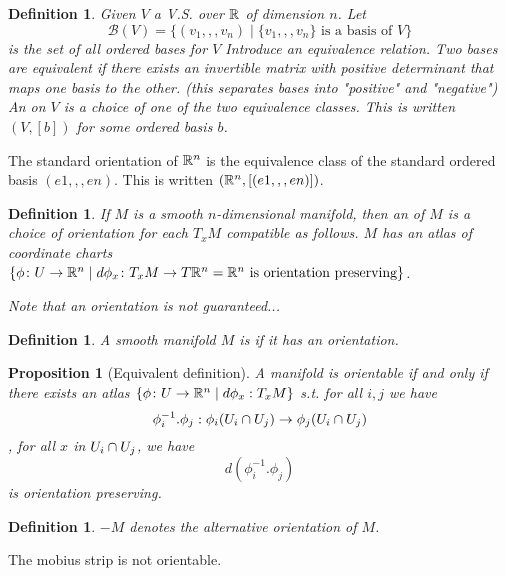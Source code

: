 \documentclass[11pt]{amsbook}
\newenvironment{dateenv}{
	\vspace{1em}
}{
	\vspace{1em}
}
\newcommand{\mydate}[4]{
	\newdate{#1}{#2}{#3}{#4}
	\begin{dateenv}
		\hfill\displaydate{#1}
	\end{dateenv}
}
\theoremstyle{mystyle} %
\newtheorem{defi}[thm]{Definition}
\newtheorem{propo}[thm]{Proposition}
\numberwithin{thm}{section}
\begin{document}
\begin{defi}
	Given $V$ a V.S. over ${\mathbb R}$ of dimension $n$.
	Let $$\mathcal{B}(V) = \{ (v_1,,,v_n) \mid \{v_1,,,v_n\} \text{ is a basis of } V \}$$ is the set of all ordered bases for $V$
	Introduce an equivalence relation.  Two bases are equivalent if there exists an invertible matrix with positive determinant that maps one basis to the other.   (this separates bases into "positive" and "negative")
	An  on $V$ is a choice of one of the two equivalence classes.  This is written $(V, [b])$ for some ordered basis $b$.
\end{defi}
\begin{example}
	The standard orientation of ${\mathbb R}^n$ is the equivalence class of the standard ordered basis $(e1,,,en)$.  This is written $({\mathbb R}^n, [(e1,,,en)])$.
\end{example}
\begin{defi}
	If $M$ is a smooth $n$-dimensional manifold, then an  of $M$ is a choice of orientation for each $T_xM$ compatible as follows.  $M$ has an atlas of coordinate charts $\{ \phi \colon U \to {\mathbb R}^n \mid d\phi_x \colon T_xM \to T{\mathbb R}^n = {\mathbb R}^n \text{ is orientation preserving} \}$.

	Note that an orientation is not guaranteed...
\end{defi}
\begin{defi}
	A smooth manifold $M$ is  if it has an orientation.
\end{defi}
\begin{propo}[Equivalent definition]
	A manifold is orientable if and only if there exists an atlas $\{ \phi \colon U \to {\mathbb R}^n \mid d\phi_x : T_xM \}$ s.t. for all $i,j$ we have $$\phi_i^{-1}.\phi_j : \phi_i(U_i \cap U_j) \to \phi_j(U_i \cap U_j)$$
	, for all $x$ in $U_i \cap U_j$, we have $$d(\phi_i^{-1}.\phi_j)$$ is orientation preserving.
\end{propo}
\begin{defi}
	$-M$ denotes the alternative orientation of $M$.
\end{defi}
\begin{example}
	The mobius strip is not orientable.
\end{example}

\mydate{d14}{16}{11}{2016}
\end{document}
